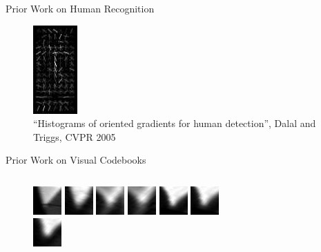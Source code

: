 \documentclass[mathserif]{beamer}
\begin{document}
\begin{frame}{Prior Work on Human Recognition}
\begin{figure}
        \includegraphics[width=.12\textwidth]{illustrations/related_work/hog_dalal05_7}
        \caption{``Histograms of oriented gradients for human detection'', Dalal and Triggs, CVPR 2005}
    \end{figure}
\end{frame}

\begin{frame}{Prior Work on Visual Codebooks}
    \begin{columns}
        \begin{column}{.5\textwidth}
            \begin{figure}
                \includegraphics[width=.5cm]{illustrations/related_work/video_google/video_google_dict1_1}
                \includegraphics[width=.5cm]{illustrations/related_work/video_google/video_google_dict1_2}
                \includegraphics[width=.5cm]{illustrations/related_work/video_google/video_google_dict1_3}
                \includegraphics[width=.5cm]{illustrations/related_work/video_google/video_google_dict1_4}
                \includegraphics[width=.5cm]{illustrations/related_work/video_google/video_google_dict1_5}
                \includegraphics[width=.5cm]{illustrations/related_work/video_google/video_google_dict1_6}\\
                \includegraphics[width=.5cm]{illustrations/related_work/video_google/video_google_dict1_7}

\end{figure}
\end{column}
\end{columns}
\end{frame}
\end{document}
